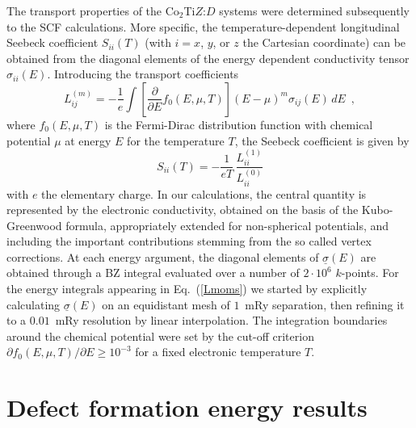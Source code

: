 \documentclass[aps,prb,twocolumn,superscriptaddress,showpacs]{revtex4}
\newcommand{\EQ}[1]{Eq.~(\ref{#1})}
\begin{document}
The transport properties of the Co$_2$Ti$Z$:$D$ systems
were determined subsequently to the SCF calculations.
More specific, the temperature-dependent
longitudinal Seebeck coefficient 
$S_{ii}(T)$ (with $i=x$, $y$, or $z$ the Cartesian
coordinate) can be obtained from the
diagonal elements of the energy dependent
conductivity tensor $\sigma_{ii}(E)$.\cite{WKE14}
Introducing the transport coefficients
\begin{equation}\label{Lmoms}
  L^{(m)}_{ij} = -\frac 1e
     \int\! \left[
  \frac{\partial}{\partial E} f_0(E,\mu,T)\right]
  \left(E-\mu\right)^m\sigma_{ij}(E)\,dE\enspace,
\end{equation}
where $f_0(E,\mu,T)$ is the Fermi-Dirac distribution function
with chemical potential $\mu$ at energy $E$ for the
temperature $T$, the Seebeck coefficient is given by
\begin{equation}\label{EQSeb}
  S_{ii}(T)  =  -\frac{1}{eT}\,\frac{L^{(1)}_{ii}}{L^{(0)}_{ii}}
\end{equation}
with $e$ the elementary charge.\cite{SebNote}
In our calculations, the central quantity is represented by the
electronic conductivity, obtained on the basis 
of the Kubo-Greenwood formula,\cite{But85,BEV87} appropriately
extended for non-spherical potentials, and including the
important contributions stemming from the
so called vertex corrections.\cite{But85}  
At each energy argument, 
the diagonal elements of $\underline\sigma(E)$ are obtained
through a BZ integral evaluated over a number of
$2\cdot 10^6$ $k$-points. For the energy integrals appearing 
in \EQ{Lmoms} we started by explicitly calculating
$\underline\sigma(E)$ on an equidistant mesh 
of $1$~mRy separation, then refining it to
a $0.01$~mRy resolution by linear interpolation.
The integration boundaries around the chemical potential
were set by the cut-off criterion 
$\partial f_0(E,\mu,T)/\partial E\geq 10^{-3}$
for a fixed electronic temperature $T$.

\section{Defect formation energy results}
\label{SecEFormDef}
\end{document}
